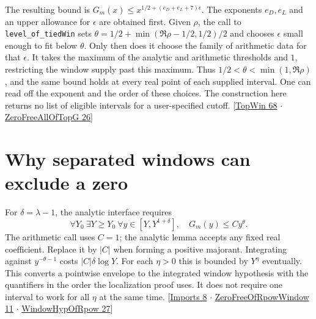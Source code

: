 \documentclass[12pt,letterpaper]{article}
\newcommand{\id}[1]{{\small\nolinkurl{#1}}}
\begin{document}
The resulting bound is $G_m(x)\le x^{1/2+(e_D+e_L+7)\epsilon}$. The exponents $e_D,e_L$ and an upper allowance for $\epsilon$ are obtained first. Given $\rho$, the call to \id{level_of_tiedWin} sets $\theta=1/2+\min(\Re\rho-1/2,1/2)/2$ and chooses $\epsilon$ small enough to fit below $\theta$. Only then does it choose the family of arithmetic data for that $\epsilon$. It takes the maximum of the analytic and arithmetic thresholds and $1$, restricting the window supply past this maximum. Thus $1/2<\theta<\min(1,\Re\rho)$, and the same bound holds at every real point of each supplied interval. One can read off the exponent and the order of these choices. The construction here returns no list of eligible intervals for a user-specified cutoff. {\small\sffamily\color{mute}[\href{https://github.com/nousentllc/riemann-hypothesis/blob/40e56bab026552e089d7afcfeff08d2defb9c005/src/Formalism/SharpRestriction/RamificationFrobenius/TotientGaloisClasses/TopWin.lean#L68}{TopWin 68} $\cdot$ \href{https://github.com/nousentllc/riemann-hypothesis/blob/40e56bab026552e089d7afcfeff08d2defb9c005/src/Development/AutomorphicArithmetic/CharacterBoxes/ZeroFreeAllOfTopG.lean#L26}{ZeroFreeAllOfTopG 26}]}

\section{Why separated windows can exclude a zero}
For $\delta=\lambda-1$, the analytic interface requires
\[
 \forall Y_0\ \exists Y\ge Y_0\ \forall y\in[Y,Y^{1+\delta}],
 \quad G_m(y)\le C y^\theta .
\]
The arithmetic call uses $C=1$; the analytic lemma accepts any fixed real coefficient. Replace it by $|C|$ when forming a positive majorant. Integrating against $y^{-\theta-1}$ costs $|C|\delta\log Y$. For each $\eta>0$ this is bounded by $Y^\eta$ eventually. This converts a pointwise envelope to the integrated window hypothesis with the quantifiers in the order the localization proof uses. It does not require one interval to work for all $\eta$ at the same time. {\small\sffamily\color{mute}[\href{https://github.com/nousentllc/riemann-hypothesis/blob/40e56bab026552e089d7afcfeff08d2defb9c005/src/Development/AutomorphicArithmetic/PrimitiveCosets/Imports.lean#L8}{Imports 8} $\cdot$ \href{https://github.com/nousentllc/riemann-hypothesis/blob/40e56bab026552e089d7afcfeff08d2defb9c005/src/Development/AutomorphicArithmetic/DedekindLFunctions/LandauTheorems/ZeroFreeOfRpowWindow.lean#L11}{ZeroFreeOfRpowWindow 11} $\cdot$ \href{https://github.com/nousentllc/riemann-hypothesis/blob/40e56bab026552e089d7afcfeff08d2defb9c005/src/Development/AutomorphicArithmetic/DedekindLFunctions/LandauTheorems/WindowHypOfRpow.lean#L27}{WindowHypOfRpow 27}]}
\end{document}
